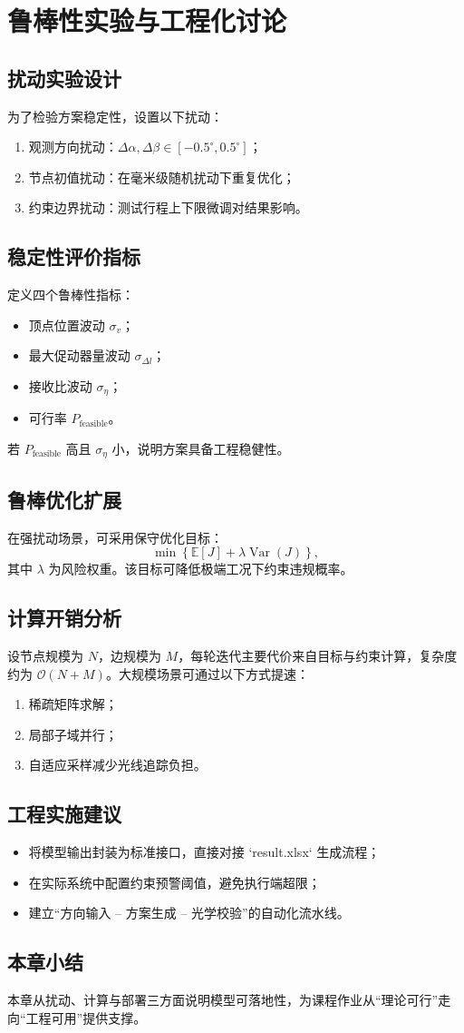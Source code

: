 \chapter{鲁棒性实验与工程化讨论}

\section{扰动实验设计}
为了检验方案稳定性，设置以下扰动：
\begin{enumerate}
  \item 观测方向扰动：$\Delta\alpha,\Delta\beta\in[-0.5^\circ,0.5^\circ]$；
  \item 节点初值扰动：在毫米级随机扰动下重复优化；
  \item 约束边界扰动：测试行程上下限微调对结果影响。
\end{enumerate}

\section{稳定性评价指标}
定义四个鲁棒性指标：
\begin{itemize}
  \item 顶点位置波动 $\sigma_v$；
  \item 最大促动器量波动 $\sigma_{\Delta l}$；
  \item 接收比波动 $\sigma_\eta$；
  \item 可行率 $P_{\text{feasible}}$。
\end{itemize}
若 $P_{\text{feasible}}$ 高且 $\sigma_\eta$ 小，说明方案具备工程稳健性。

\section{鲁棒优化扩展}
在强扰动场景，可采用保守优化目标：
\[
\min \left\{\mathbb E[J]+\lambda \operatorname{Var}(J)\right\},
\]
其中 $\lambda$ 为风险权重。该目标可降低极端工况下约束违规概率。

\section{计算开销分析}
设节点规模为 $N$，边规模为 $M$，每轮迭代主要代价来自目标与约束计算，复杂度约为 $\mathcal O(N+M)$。大规模场景可通过以下方式提速：
\begin{enumerate}
  \item 稀疏矩阵求解；
  \item 局部子域并行；
  \item 自适应采样减少光线追踪负担。
\end{enumerate}

\section{工程实施建议}
\begin{itemize}
  \item 将模型输出封装为标准接口，直接对接 `result.xlsx` 生成流程；
  \item 在实际系统中配置约束预警阈值，避免执行端超限；
  \item 建立“方向输入 -- 方案生成 -- 光学校验”的自动化流水线。
\end{itemize}

\section{本章小结}
本章从扰动、计算与部署三方面说明模型可落地性，为课程作业从“理论可行”走向“工程可用”提供支撑。

